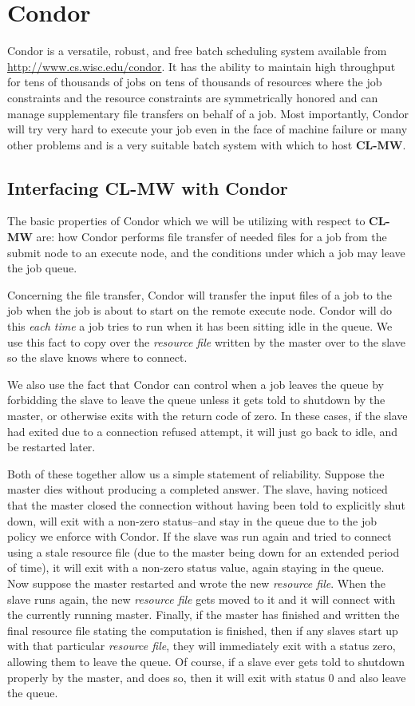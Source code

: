 \documentclass[titlepage,12pt]{book}
\newcommand{\xsmall}{\latexhtml{\small}{}}
\newcommand{\xnormalsize}{\latexhtml{\normalsize}{}}
\newcommand{\clmw}{\xsmall\textbf{CL-MW}\xnormalsize\xspace}
\newcommand{\rfile}{\textit{resource file}\xspace}
\begin{document}
\section{Condor}

Condor is a versatile, robust, and free batch scheduling system
available from \url{http://www.cs.wisc.edu/condor}. It has the ability
to maintain high throughput for tens of thousands of jobs on tens of
thousands of resources where the job constraints and the resource
constraints are symmetrically honored and can manage supplementary
file transfers on behalf of a job. Most importantly, Condor will try
very hard to execute your job even in the face of machine failure or
many other problems and is a very suitable batch system with which
to host \clmw.

\subsection{Interfacing \clmw with Condor}

The basic properties of Condor which we will be utilizing with respect
to \clmw are: how Condor performs file transfer of needed files for
a job from the submit node to an execute node, and the conditions
under which a job may leave the job queue.

Concerning the file transfer, Condor will transfer the input files
of a job to the job when the job is about to start on the remote
execute node. Condor will do this \emph{each time} a job tries to
run when it has been sitting idle in the queue. We use this fact to
copy over the \rfile written by the master over to the slave so the
slave knows where to connect.

We also use the fact that Condor can control when a job leaves the
queue by forbidding the slave to leave the queue unless it gets told
to shutdown by the master, or otherwise exits with the return code
of zero. In these cases, if the slave had exited due to a connection
refused attempt, it will just go back to idle, and be restarted later.

Both of these together allow us a simple statement of reliability.
Suppose the master dies without producing a completed answer.
The slave, having noticed that the master closed the connection
without having been told to explicitly shut down, will exit with
a non-zero status--and stay in the queue due to the job policy
we enforce with Condor.  If the slave was run again and tried to
connect using a stale resource file (due to the master being down
for an extended period of time), it will exit with a non-zero status
value, again staying in the queue.  Now suppose the master restarted
and wrote the new \rfile.  When the slave runs again, the new \rfile
gets moved to it and it will connect with the currently running master.
Finally, if the master has finished and written the final resource
file stating the computation is finished, then if any slaves start up
with that particular \rfile, they will immediately exit with a status
zero, allowing them to leave the queue. Of course, if a slave ever
gets told to shutdown properly by the master, and does so, then it
will exit with status 0 and also leave the queue.
\end{document}
